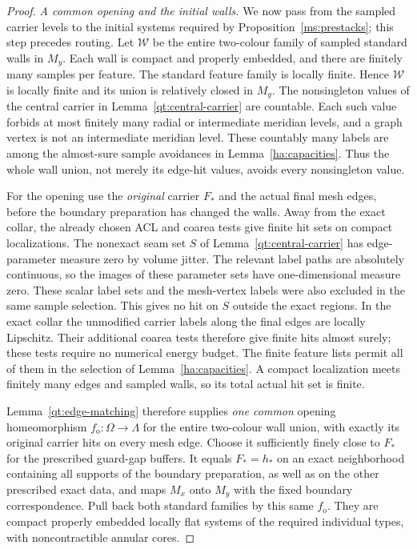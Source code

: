 \begin{proof}
\emph{A common opening and the initial walls.}
We now pass from the sampled carrier levels to the initial systems
required by Proposition~\ref{ms:prestacks}; this step precedes routing.
Let $\mathcal W$ be the entire two-colour family of sampled standard
walls in $M_y$.  Each wall is compact and properly embedded, and
there are finitely many samples per feature.  The standard feature
family is locally finite.  Hence $\mathcal W$ is locally finite and
its union is relatively closed in $M_y$.  The nonsingleton values
of the central carrier in Lemma~\ref{qt:central-carrier} are
countable.  Each such value forbids at most finitely many radial
or intermediate meridian levels, and a graph vertex is not an
intermediate meridian level.  These countably many labels are among
the almost-sure sample avoidances in Lemma~\ref{ha:capacities}.
Thus the whole wall union,
not merely its edge-hit values, avoids every nonsingleton value.

For the opening use the \emph{original} carrier $F_*$ and the
actual final mesh edges, before the boundary preparation has
changed the walls.  Away from the exact collar, the already chosen
ACL and coarea tests give finite hit sets on compact localizations.
The nonexact seam set $S$ of Lemma~\ref{qt:central-carrier} has
edge-parameter measure zero by volume jitter.  The relevant label
paths are absolutely continuous, so the images of these parameter
sets have one-dimensional measure zero.  These scalar label sets
and the mesh-vertex labels were also excluded in the same sample
selection.  This gives no hit on $S$ outside the exact regions.
In the exact collar the unmodified carrier labels along the final
edges are locally Lipschitz.  Their additional coarea tests therefore
give finite hits almost surely; these tests require no numerical
energy budget.  The finite feature lists permit all of them in
the selection of Lemma~\ref{ha:capacities}.  A
compact localization meets finitely many edges and sampled walls,
so its total actual hit set is finite.

Lemma~\ref{qt:edge-matching} therefore supplies \emph{one common}
opening homeomorphism $f_{\mathrm o}:\Omega\to\Lambda$ for the
entire two-colour wall union, with exactly its original carrier
hits on every mesh edge.  Choose it sufficiently finely close to
$F_*$ for the prescribed guard-gap buffers.  It equals $F_*=h_*$
on an exact neighborhood containing all supports of the boundary
preparation, as well as on the other prescribed exact data, and
maps $M_x$ onto $M_y$ with the fixed boundary correspondence.
Pull back both standard families by this same $f_{\mathrm o}$.
They are compact properly embedded locally flat systems of the
required individual types, with noncontractible annular cores.


\end{proof}
